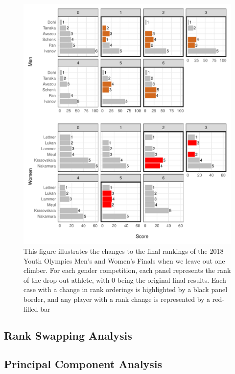 \documentclass[12pt]{article}
\begin{document}
\begin{figure}

{\centering \includegraphics{draft_files/figure-latex/unnamed-chunk-20-1} 

}

\caption{This figure illustrates the changes to the final rankings of the 2018 Youth Olympics Men's and Women's Finals when we leave out one climber. For each gender competition, each panel represents the rank of the drop-out athlete, with 0 being the original final results. Each case with a change in rank orderings is highlighted by a black panel border, and any player with a rank change is represented by a red-filled bar}\label{fig:unnamed-chunk-20}
\end{figure}

\hypertarget{rank-swapping-analysis}{%
\subsection{Rank Swapping Analysis}\label{rank-swapping-analysis}}

\hypertarget{principal-component-analysis}{%
\subsection{Principal Component
Analysis}\label{principal-component-analysis}}
\end{document}
